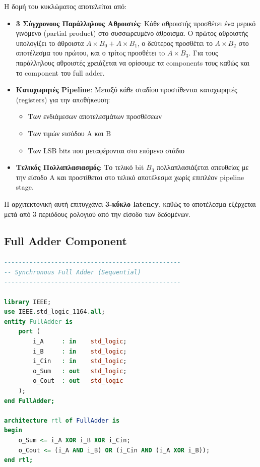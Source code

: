\documentclass[12pt]{article}
\begin{document}
Η δομή του κυκλώματος αποτελείται από:
\begin{itemize}
    \item \textbf{3 Σύγχρονους Παράλληλους Αθροιστές}: Κάθε αθροιστής προσθέτει ένα μερικό γινόμενο (partial product) στο συσσωρευμένο άθροισμα. Ο πρώτος αθροιστής υπολογίζει το άθροιστα $A \times B_0 + A \times B_1$, ο δεύτερος προσθέτει το $A \times B_2$ στο αποτέλεσμα του πρώτου, και ο τρίτoς προσθέτει τo $A \times B_3$. Για τους παράλληλους αθροιστές χρειάζεται να ορίσουμε τα components τους καθώς και το component του full adder.
    \item \textbf{Καταχωρητές Pipeline}: Μεταξύ κάθε σταδίου προστίθενται καταχωρητές (registers) για την απoθήκeυση:
        \begin{itemize}
            \item Των ενδιάμεσων αποτελεσμάτων προσθέσεων
            \item Των τιμών εισόδου A και B
            \item Των LSB bits που μεταφέρονται στο επόμενο στάδιο
        \end{itemize}
    \item \textbf{Τελικός Πολλαπλασιασμός}: Το τελικό bit $B_3$ πολλαπλασιάζεται απευθείας με την είσοδο A και προστίθεται στο τελικό αποτέλεσμα χωρίς επιπλέον pipeline stage.
\end{itemize}

Η αρχιτεκτονική αυτή επιτυγχάνει \textbf{3-κύκλο latency}, καθώς το αποτέλεσμα εξέρχεται μετά από 3 περιόδους ρολογιού από την είσοδο των δεδομένων.

\subsection*{Full Adder Component}
\begin{lstlisting}[language=VHDL]
-------------------------------------------------
-- Synchronous Full Adder (Sequential)
-------------------------------------------------

library IEEE;
use IEEE.std_logic_1164.all;
entity FullAdder is
    port (
        i_A     : in    std_logic;
        i_B     : in    std_logic;
        i_Cin   : in    std_logic;
        o_Sum   : out   std_logic;
        o_Cout  : out   std_logic
    );
end FullAdder;

architecture rtl of FullAdder is
begin
    o_Sum <= i_A XOR i_B XOR i_Cin;
    o_Cout <= (i_A AND i_B) OR (i_Cin AND (i_A XOR i_B));
end rtl;
\end{lstlisting}
\end{document}
